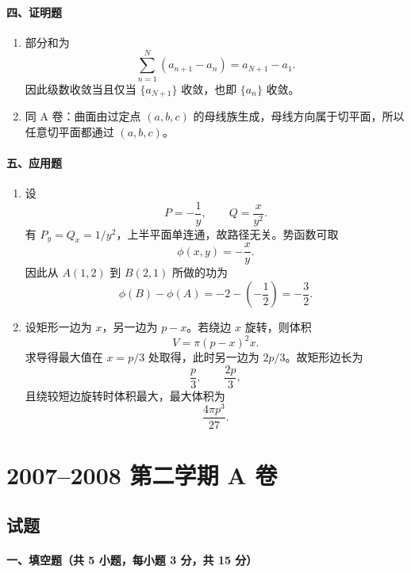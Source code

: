 \paragraph{四、证明题}
\begin{enumerate}
  \item 部分和为
  \[
  \sum_{n=1}^N(a_{n+1}-a_n)=a_{N+1}-a_1.
  \]
  因此级数收敛当且仅当 $\{a_{N+1}\}$ 收敛，也即 $\{a_n\}$ 收敛。
  \item 同 A 卷：曲面由过定点 $(a,b,c)$ 的母线族生成，母线方向属于切平面，所以任意切平面都通过 $(a,b,c)$。
\end{enumerate}

\paragraph{五、应用题}
\begin{enumerate}
  \item 设
  \[
  P=-\frac1y,\qquad Q=\frac{x}{y^2}.
  \]
  有 $P_y=Q_x=1/y^2$，上半平面单连通，故路径无关。势函数可取
  \[
  \phi(x,y)=-\frac{x}{y}.
  \]
  因此从 $A(1,2)$ 到 $B(2,1)$ 所做的功为
  \[
  \phi(B)-\phi(A)=-2-\left(-\frac12\right)=-\frac32.
  \]
  \item 设矩形一边为 $x$，另一边为 $p-x$。若绕边 $x$ 旋转，则体积
  \[
  V=\pi(p-x)^2x.
  \]
  求导得最大值在 $x=p/3$ 处取得，此时另一边为 $2p/3$。故矩形边长为
  \[
  \frac p3,\qquad \frac{2p}{3},
  \]
  且绕较短边旋转时体积最大，最大体积为
  \[
  \frac{4\pi p^3}{27}.
  \]
\end{enumerate}

\section{2007--2008 第二学期 A 卷}

\subsection{试题}

\paragraph{一、填空题（共 5 小题，每小题 3 分，共 15 分）}

